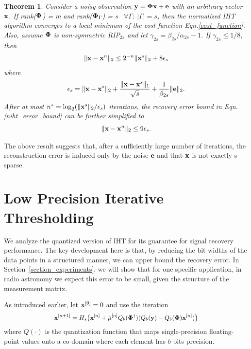\documentclass{article}
\newtheorem{theorem}{Theorem}
\begin{document}
\begin{theorem}\label{guarantee_niht}
{\rm{\cite{blumensath2010niht}}}
Consider a noisy observation ${\bf y} = {\bf \Phi x} + {\bf e}$ with an arbitrary vector ${\bf x}$. If rank({${\bf \Phi}$}) = m and rank(${\bf \Phi}_{\Gamma}$) = s \ $\forall \Gamma:\ |\Gamma| = s$, then the normalized IHT algorithm converges to a local minimum of the cost function Eqn.\ref{cost_function}. Also, assume ${\bf \Phi}$ is non-symmetric RIP$_{2s}$ and let $\gamma_{2s} = \beta_{2s}/\alpha_{2s}-1$. If $\gamma_{2s} \leq {1}/{8}$, then
\begin{equation}
\small
    \| {\bf x}-{\bf x}^n\|_2 \leq 2^{-n}\| {\bf x}^s\|_2 + 8 {{\bf \epsilon}_s}\label{niht_error_bound}
\end{equation} where \begin{equation}
\small
     {{\bf \epsilon}_s} =  \| {\bf x}-{\bf x}^s\|_2 + \frac{\| {\bf x}-{\bf x}^s\|_1}{\sqrt{s}}+\frac{1}{\beta_{2s}}\|{\bf e} \|_2.
\end{equation}
After at most $n^*=\log_2(\|{\bf x}^s\|_2/ {\bf \epsilon}_s)$ iterations, the recovery error bound in Eqn.\ref{niht_error_bound} can be further simplified to
\begin{equation}
\small
   \| {\bf x}-{\bf x}^n\|_2 \leq 9 {{\bf \epsilon}_s}.
\end{equation}
\end{theorem}
The above result suggests that, after a sufficiently large number of iterations, the reconstruction error is induced only by the noise ${\bf e}$ and that ${\bf x}$ is not exactly s-sparse.

\vspace{-0.5em}
\section{Low Precision Iterative Thresholding}\label{section_lpiht}
\vspace{-1em}

We analyze the
quantized version of IHT for 
its guarantee for signal recovery performance.
The key development here is that, by reducing the bit widths of the data points in a structured manner, we
can upper bound the recovery error. 
In Section~\ref{section_experiments},
we will show that for one specific application,
in radio astronomy
we expect this error to be small, given
the structure of the measurement matrix.

As introduced earlier, let ${\bf x}^{[0]} = 0$ and use the iteration
\begin{equation} \label{modified_update_rule}
\small
  {\bf x}^{[n+1]} = H_s\big({\bf x}^{[n]}+\hat{\mu}^{[n]} Q_b(\boldsymbol{\Phi}^{\dagger})(Q_b({\bf y})-Q_b(\boldsymbol{\Phi}){\bf x}^{[n]})\big)  
\end{equation}
where $Q(\cdot)$ is the quantization function that maps single-precision floating-point values onto a co-domain where each element has $b$-bits precision.
\end{document}
